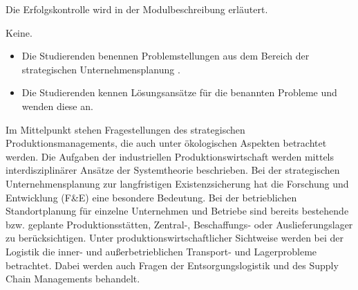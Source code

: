 \begin{course}

\setdoclanguagegerman
{}



\coursehead


\label{cour_4595.dp_997}


\begin{styleenv}
\begin{assessment}
Die Erfolgskontrolle wird in der Modulbeschreibung erläutert.


\end{assessment}

\begin{conditions}Keine.\end{conditions}


\end{styleenv}

\begin{learningoutcomes}
\begin{itemize}\item Die Studierenden benennen Problemstellungen aus dem Bereich der strategischen Unternehmensplanung .  \item Die Studierenden kennen Lösungsansätze für die benannten Probleme und wenden diese an.  \end{itemize}
\end{learningoutcomes}

\begin{content}
Im Mittelpunkt stehen Fragestellungen des strategischen Produktionsmanagements, die auch unter ökologischen Aspekten betrachtet werden. Die Aufgaben der industriellen Produktionswirtschaft werden mittels interdisziplinärer Ansätze der Systemtheorie beschrieben. Bei der strategischen Unternehmensplanung zur langfristigen Existenzsicherung hat die Forschung und Entwicklung (F\&E) eine besondere Bedeutung. Bei der betrieblichen Standortplanung für einzelne Unternehmen und Betriebe sind bereits bestehende bzw. geplante Produktionsstätten, Zentral-, Beschaffungs- oder Auslieferungslager zu berücksichtigen. Unter produktionswirtschaftlicher Sichtweise werden bei der Logistik die inner- und außerbetrieblichen Transport- und Lagerprobleme betrachtet. Dabei werden auch Fragen der Entsorgungslogistik und des Supply Chain Managements behandelt.



\end{content}
\end{course}
